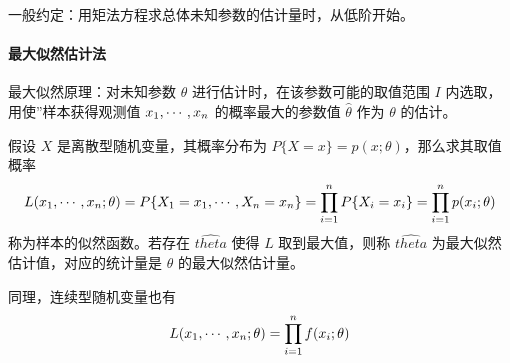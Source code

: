 一般约定：用矩法方程求总体未知参数的估计量时，从低阶开始。

\paragraph{最大似然估计法}

最大似然原理：对未知参数 $\theta$ 进行估计时，在该参数可能的取值范围 $I$ 内选取，用使”样本获得观测值 $x_1,\cdots,x_n$ 的概率最大的参数值 $\hat{\theta}$ 作为 $\theta$ 的估计。

假设 $X$ 是离散型随机变量，其概率分布为 $P\{X = x\} = p(x; \theta)$，那么求其取值概率
\[ L(x_1,\cdots,x_n;\theta) = P\{X_1 = x_1, \cdots, X_n = x_n\} = \prod_{i=1}^n P\{X_i=x_i\} = \prod_{i=1}^n p(x_i; \theta) \]
称为样本的似然函数。若存在 $\hat{theta}$ 使得 $L$ 取到最大值，则称 $\hat{theta}$ 为最大似然估计值，对应的统计量是 $\theta$ 的最大似然估计量。

同理，连续型随机变量也有
\[ L(x_1,\cdots,x_n; \theta) = \prod_{i=1}^n f(x_i; \theta) \]



